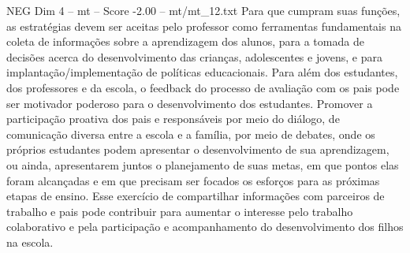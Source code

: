 \begin{textsample}{NEG Dim 4 – mt – Score -2.00 – mt/mt\_12.txt}
Para que cumpram suas funções, as estratégias devem ser aceitas pelo professor como ferramentas fundamentais na coleta de informações sobre a aprendizagem dos alunos, para a tomada de decisões acerca do desenvolvimento das crianças, adolescentes e jovens, e para implantação/implementação de políticas educacionais.
Para além dos estudantes, dos professores e da escola, o feedback do processo de avaliação com os pais pode ser motivador poderoso para o desenvolvimento dos estudantes.
Promover a participação proativa dos pais e responsáveis por meio do diálogo, de comunicação diversa entre a escola e a família, por meio de debates, onde os próprios estudantes podem apresentar o desenvolvimento de sua aprendizagem, ou ainda, apresentarem juntos o planejamento de suas metas, em que pontos elas foram alcançadas e em que precisam ser focados os esforços para as próximas etapas de ensino.
Esse exercício de compartilhar informações com parceiros de trabalho e pais pode contribuir para aumentar o interesse pelo trabalho colaborativo e pela participação e acompanhamento do desenvolvimento dos filhos na escola.

\end{textsample}
